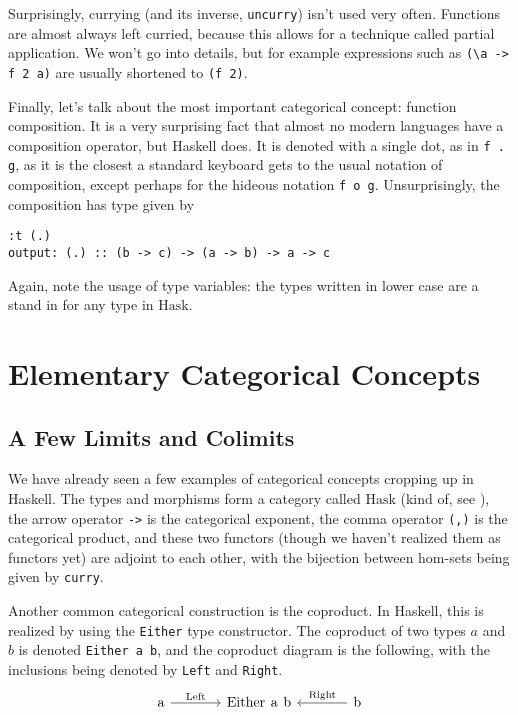 \documentclass[11	pt]{article}
\theoremstyle{nonumberplain}
\newcommand{\Hask}{\mathrm{Hask}}
\newcommand*\lsin{\lstinline}
\newcommand*\lsmath[1]{\text{\lstinline|#1|}}
\begin{document}
Surprisingly, currying (and its inverse, \lsin|uncurry|) isn't used very often. Functions are almost always left curried, because this allows for a technique called partial application. We won't go into details, but for example expressions such as \lsin|(\a -> f 2 a)| are usually shortened to \lsin|(f 2)|.

Finally, let's talk about the most important categorical concept: function composition. It is a very surprising fact that almost no modern languages have a composition operator, but Haskell does. It is denoted with a single dot, as in \lsin|f . g|, as it is the closest a standard keyboard gets to the usual notation of composition, except perhaps for the hideous notation \lsin|f o g|. Unsurprisingly, the composition has type given by
\begin{lstlisting}
:t (.)
output: (.) :: (b -> c) -> (a -> b) -> a -> c
\end{lstlisting}

Again, note the usage of type variables: the types written in lower case are a stand in for any type in $\Hask$.


\section{Elementary Categorical Concepts}

\subsection{A Few Limits and Colimits}\label{limcolim}

We have already seen a few examples of categorical concepts cropping up in Haskell. The types and morphisms form a category called $\Hask$ (kind of, see \cite{haskisnotcat}), the arrow operator \lsin|->| is the categorical exponent, the comma operator \lsin|(,)| is the categorical product, and these two functors (though we haven't realized them as functors yet) are adjoint to each other, with the bijection between hom-sets being given by \lsin|curry|.

Another common categorical construction is the coproduct. In Haskell, this is realized by using the \lsin|Either| type constructor. The coproduct of two types $a$ and $b$ is denoted \lsin|Either a b|, and the coproduct diagram is the following, with the inclusions being denoted by \lsin|Left| and \lsin|Right|.
\begin{equation}
\begin{tikzcd}[column sep = large]
\lsmath{a} \arrow[r, "\lsmath{Left}"] & \lsmath{Either a b} & \lsmath{b} \arrow[l, "\lsmath{Right}"']
\end{tikzcd}
\end{equation}
\end{document}
